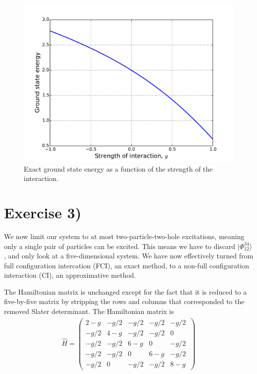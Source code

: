 \documentclass[a4paper, 11pt, notitlepage, english]{article}
\newcommand{\ket}[1]{|#1 \rangle}
\newcommand{\op}[1]{\hat{#1}}
\begin{document}
\begin{figure}[htpb]
	\includegraphics[width=\textwidth]{proj1_exact.pdf}
	\caption{Exact ground state energy as a function of the strength of the interaction. \label{fig:plot1}}
\end{figure}

\clearpage

\section*{Exercise 3)}

We now limit our system to at most two-particle-two-hole excitations, meaning only a single pair of particles can be excited. This means we have to discard $\ket{\Phi_{12}^{34}}$, and only look at a five-dimensional system. We have now effectively turned from full configuration intercation (FCI), an exact method, to a non-full configuration interaction (CI), an approximative method.

The Hamiltonian matrix is unchanged except for the fact that it is reduced to a five-by-five matrix by stripping the rows and columns that corresponded to the removed Slater determinant. The Hamiltonian matrix is
\begin{align*}
\op{H} = \begin{pmatrix}
2 - g &  -g/2 & -g/2  & -g/2  & -g/2  \\
-g/2  & 4 - g & -g/2  & -g/2  & 0     \\
-g/2  & -g/2  & 6 - g &	0     & -g/2  \\              
-g/2  & -g/2  & 0     & 6 - g &	-g/2  \\                         
-g/2  &	0	  & -g/2  & -g/2  & 8 - g \
\end{pmatrix}
\end{align*}
\end{document}
